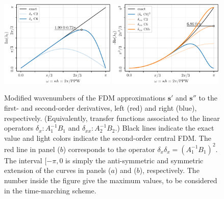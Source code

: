 \begin{figure}
  \includegraphics[clip,width=0.49\textwidth]{figs/Fdm1}\hfill
  \includegraphics[clip,width=0.49\textwidth]{figs/Fdm2}
  \caption{Modified wavenumbers of the FDM approximations $\mathbf{s'}$ and $\mathbf{s''}$ to the first- and second-order derivatives, left (red) and right (blue), respectively. (Equivalently, transfer functions associated to the linear operators $\delta_{x}: A_1^{-1}B_1$ and $\delta_{xx}: A_2^{-1}B_2$.) Black lines indicate the exact value and light colors indicate the second-order central FDM. The red line in panel ($b$) corresponds to the operator $\delta_{x}\delta_{x} =(A_1^{-1}B_1)^2$. The interval $[-\pi,0$ is simply the anti-symmetric and symmetric extension of the curves in panels ($a$) and ($b$), respectively. The number inside the figure give the maximum values, to be considered in the time-marching scheme.}\label{fig:fdm}
\end{figure}


